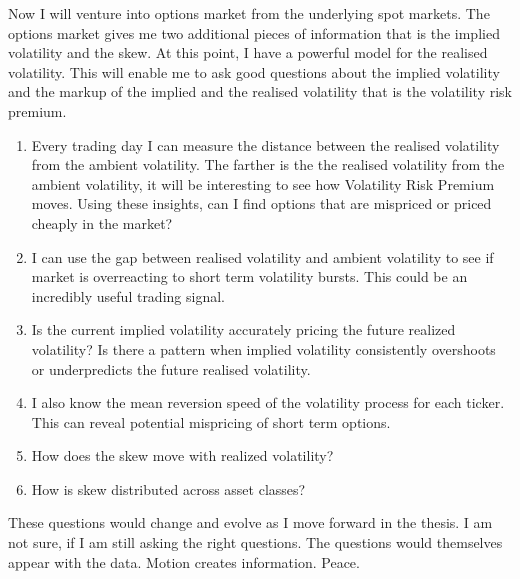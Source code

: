 Now I will venture into options market from the underlying spot markets.  The options market gives me two additional pieces of information that is the implied volatility and the skew.  At this point, I have a powerful model for the realised volatility.  This will enable me to ask good questions about  the implied volatility and the markup of the implied and the realised volatility that is the volatility risk premium.

\begin{enumerate}
\item Every trading day I can measure the distance between the realised volatility from the ambient volatility. The farther is the the realised volatility from the ambient volatility, it will be interesting to see how Volatility Risk Premium moves. Using these insights, can I find options that are mispriced or priced cheaply in the market?
\item I can use the gap between realised volatility and ambient volatility to see if market is overreacting to short term volatility bursts. This could be an incredibly useful trading signal.
\item Is the current implied volatility accurately pricing the future realized volatility? Is there a pattern when implied volatility consistently overshoots or underpredicts the future realised volatility.
\item I also know the mean reversion speed of the volatility process for each ticker. This can reveal potential mispricing of short term options.
\item How does the skew move with realized volatility?
\item How is skew distributed across asset classes?
\end{enumerate}


These questions would change and evolve as I move forward in the thesis. I am not sure, if I am still asking the right questions. The questions would themselves appear with the data. Motion creates information. Peace.

